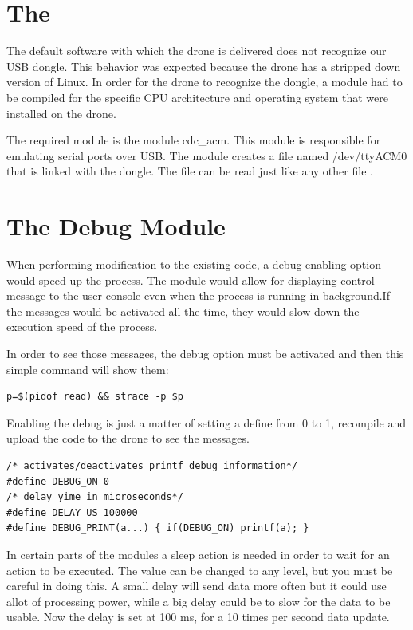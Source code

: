 \section{The }

The default software with which the drone is delivered does not recognize our USB dongle. This behavior was expected because the drone has a stripped down version of Linux. In order for the drone to recognize the dongle, a module had to be compiled for the specific CPU architecture and operating system that were installed on the drone.

The required module is the module cdc\_acm\cite{cdcacm}. This module is responsible for emulating serial ports over USB. The module creates a file named /dev/ttyACM0 that is linked with the dongle. The file can be read just like any other file . 

\section{The Debug Module}
 
When performing modification to the existing code, a debug enabling option would speed up the process. The module would allow for displaying control message to the user console even when the process is running in background.If the messages would be activated all the time, they would slow down the execution speed of the process.

In order to see those messages, the debug option must be activated and then this simple command will show them:

\begin{lstlisting}
p=$(pidof read) && strace -p $p
\end{lstlisting}

Enabling the debug is just a matter of setting  a define from 0 to 1, recompile and upload the code to the drone to see the messages.

\lstset{numbers=none, mathescape=true, nolol=false,caption=Debug and timing defines,label=lst:task}
\begin{lstlisting}
/* activates/deactivates printf debug information*/
#define DEBUG_ON 0
/* delay yime in microseconds*/
#define DELAY_US 100000
#define DEBUG_PRINT(a...) { if(DEBUG_ON) printf(a); }
\end{lstlisting}

In certain parts of the modules a sleep action is needed in order to wait for an action to be executed. The value can be changed to any level, but you must be careful in doing this. A small delay will send data more often but it could use allot of processing power, while a big delay could be to slow for the data to be usable. Now the delay is set at 100 ms, for a 10 times per second data update.




